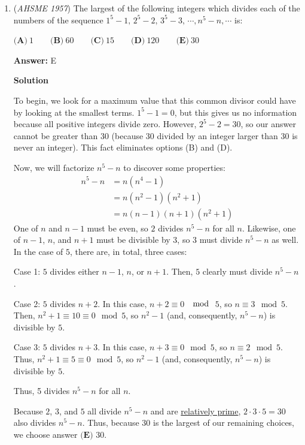 \begin{enumerate}
 


	\item (\textit{AHSME 1957}) The largest of the following integers which divides each of the numbers of the sequence $1^5 - 1,\, 2^5 - 2,\, 3^5 - 3,\, \cdots, n^5 - n, \cdots$ is: 


 $\textbf{(A)}\ 1 \qquad \textbf{(B)}\ 60 \qquad \textbf{(C)}\ 15 \qquad \textbf{(D)}\ 120\qquad \textbf{(E)}\ 30$

 \textbf{Answer: }E



\textbf{Solution}

To begin, we look for a maximum value that this common divisor could have by looking at the smallest terms. $1^5-1=0$, but this gives us no information because all positive integers divide zero. However, $2^5-2=30$, so our answer cannot be greater than $30$ (because $30$ divided by an integer larger than $30$ is never an integer). This fact eliminates options (B) and (D).

 Now, we will factorize $n^5-n$ to discover some properties:\begin{align*}n^5-n &= n(n^4-1) \\&= n(n^2-1)(n^2+1) \\&= n(n-1)(n+1)(n^2+1)\end{align*}
One of $n$ and $n-1$ must be even, so $2$ divides $n^5-n$ for all $n$. Likewise, one of $n-1$, $n$, and $n+1$ must be divisible by $3$, so $3$ must divide $n^5-n$ as well. In the case of $5$, there are, in total, three cases:

 Case 1: $5$ divides either $n-1$, $n$, or $n+1$. Then, $5$ clearly must divide $n^5-n$.

 Case 2: $5$ divides $n+2$. In this case, $n+2 \equiv 0$ $\mod$ $5$, so $n \equiv 3 \mod 5$. Then, $n^2+1 \equiv 10 \equiv 0 \mod 5$, so $n^2-1$ (and, consequently, $n^5-n$) is divisible by $5$.

 Case 3: $5$ divides $n+3$. In this case, $n+3 \equiv 0 \mod 5$, so $n \equiv 2 \mod 5$. Thus, $n^2+1 \equiv 5 \equiv 0 \mod 5$, so $n^2-1$ (and, consequently, $n^5-n$) is divisible by $5$.

 Thus, 5 divides $n^5-n$ for all $n$.

 Because $2$, $3$, and $5$ all divide $n^5-n$ and are \href{https://artofproblemsolving.com/wiki/index.php?title=Relatively\_prime}{relatively prime}, $2 \cdot 3 \cdot 5 = 30$ also divides $n^5-n$. Thus, because $30$ is the largest of our remaining choices, we choose answer $\boxed{\textbf{(E) }30}$.


\end{enumerate}

